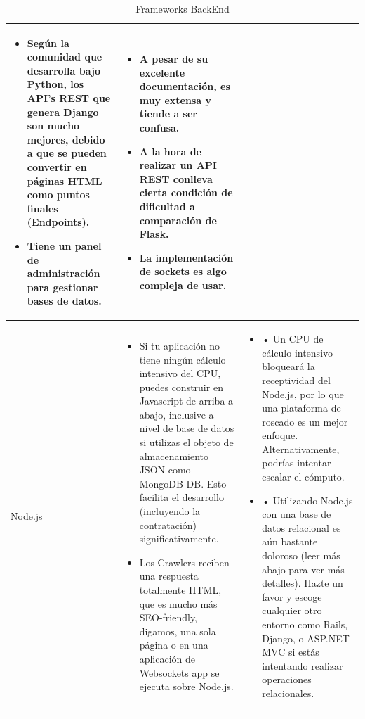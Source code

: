 \documentclass[a4paper,12 pt]{article}
\begin{document}
\begin{table}[H]
{\begin{tabular}{|M{2.5cm}|M{6.5cm}|M{6.5cm}|}
\begin{itemize}
                \item Según la comunidad que desarrolla bajo Python, los API’s REST que genera Django son mucho mejores, debido a que se pueden convertir en páginas HTML como puntos finales (Endpoints).
                \item Tiene un panel de administración para gestionar bases de datos.
            \end{itemize}   &
            \begin{itemize}
                \item A pesar de su excelente documentación, es muy extensa y tiende a ser confusa.
                \item A la hora de realizar un API REST conlleva cierta condición de dificultad a comparación de Flask.
                \item La implementación de sockets es algo compleja de usar.
            \end{itemize}
            \\
        \hline
            Node.js  &
            \begin{itemize}
                \item Si tu aplicación no tiene ningún cálculo intensivo del CPU, puedes construir en Javascript de arriba a abajo, inclusive a nivel de base de datos si utilizas el objeto de almacenamiento JSON como MongoDB DB. Esto facilita el desarrollo (incluyendo la contratación) significativamente.
                \item Los Crawlers reciben una respuesta totalmente HTML, que es mucho más SEO-friendly, digamos, una sola página o en una aplicación de Websockets app se ejecuta sobre Node.js.
            \end{itemize}   &
            \begin{itemize}
                \item • Un CPU de cálculo intensivo bloqueará la receptividad del Node.js, por lo que una plataforma de roscado es un mejor enfoque. Alternativamente, podrías intentar escalar el cómputo.
                \item • Utilizando Node.js con una base de datos relacional es aún bastante doloroso (leer más abajo para ver más detalles). Hazte un favor y escoge cualquier otro entorno como Rails, Django, o ASP.NET MVC si estás intentando realizar operaciones relacionales.
            \end{itemize}
            \\
        \hline
            
    \end{tabular}
    \caption{Frameworks BackEnd}
    }
\end{table}{}
\end{document}

